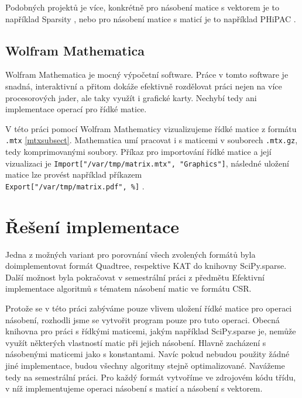 Podobných projektů je více, konkrétně pro násobení matice s vektorem je to například Sparsity \cite{sparsity}, nebo pro násobení matice s maticí je to například PHiPAC \cite{PHiPAC}\cite{bilmes96a}.

\subsection{Wolfram Mathematica}

Wolfram Mathematica \cite{mathematica} je mocný výpočetní software. Práce v tomto software je snadná, interaktivní a přitom dokáže efektivně rozdělovat práci nejen na více procesorových jader, ale taky využít i grafické karty. Nechybí tedy ani implementace operací pro řídké matice.

V této práci pomocí Wolfram Mathematicy vizualizujeme řídké matice z formátu \texttt{.mtx} \ref{mtxsubsect}. Mathematica umí pracovat i s maticemi v souborech \texttt{.mtx.gz}, tedy komprimovanými soubory. Příkaz pro importování řídké matice a její vizualizaci je \texttt{Import["/var/tmp/matrix.mtx", "Graphics"]}, následné uložení matice lze provést například příkazem \\ \texttt{Export["/var/tmp/matrix.pdf", \%]} \cite{mathematicaMTX}.

\section{Řešení implementace}

Jedna z možných variant pro porovnání všech zvolených formátů byla doimplementovat formát Quadtree, respektive KAT do knihovny SciPy.sparse. Další možnost byla pokračovat v semestrální práci z předmětu Efektivní implementace algoritmů s tématem násobení matic ve formátu CSR.

Protože se v této práci zabýváme pouze vlivem uložení řídké matice pro operaci násobení, rozhodli jsme se vytvořit program pouze pro tuto operaci. Obecná knihovna pro práci s řídkými maticemi, jakým například SciPy.sparse je, nemůže využít některých vlastností matic při jejich násobení. Hlavně zacházení s násobenými maticemi jako s konstantami. Navíc pokud nebudou použity žádné jiné implementace, budou všechny algoritmy stejně optimalizované. Navážeme tedy na semestrální práci. Pro každý formát vytvoříme ve zdrojovém kódu třídu, v níž implementujeme operaci násobení s maticí a násobení s vektorem.
